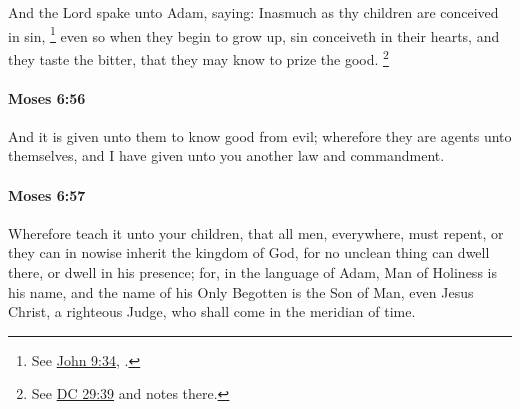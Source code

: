 			And the Lord spake unto Adam, saying: Inasmuch as thy children are conceived in sin,%
				\footnote{%
					See \hyperref[JOHN-9-34]{John 9:34}, .
					}
			even so when they begin to grow up, sin conceiveth in their hearts, and they taste the bitter, that they may know to prize the good.%
				\footnote{%
					See \hyperref[DC29-39]{DC 29:39} and notes there.
					}


		\paragraph{Moses 6:56} %
			\label{MOSES-6-56}

			And it is given unto them to know good from evil; wherefore they are agents unto themselves, and I have given unto you another law and commandment.


		\paragraph{Moses 6:57} %
			\label{MOSES-6-57}

			Wherefore teach it unto your children, that all men, everywhere, must repent, or they can in nowise inherit the kingdom of God, for no unclean thing can dwell there, or dwell in his presence; for, in the language of Adam, Man of Holiness is his name, and the name of his Only Begotten is the Son of Man, even Jesus Christ, a righteous Judge, who shall come in the meridian of time.

